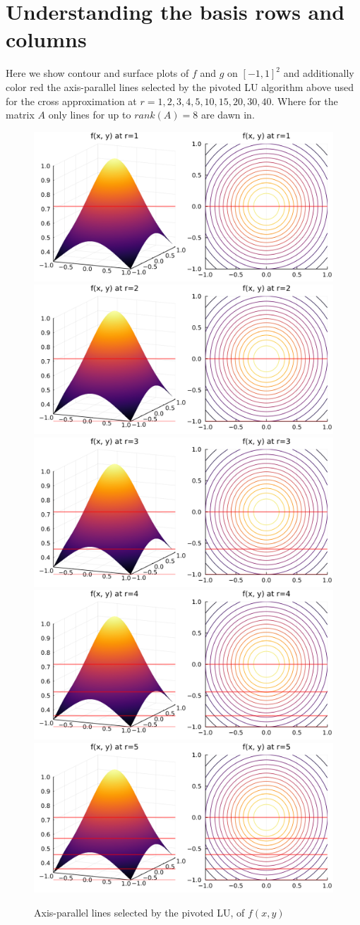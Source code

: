 \documentclass[a4paper]{article}
\begin{document}
\section{Understanding the basis rows and columns}
Here we show contour and surface plots of $f$ and $g$ on $[-1, 1]^2$ and
additionally color red the axis-parallel lines selected by the pivoted LU
algorithm above used for the cross approximation at $r = 1, 2, 3, 4, 5, 10,
15, 20, 30, 40$. Where for the matrix $A$ only lines for up to $rank(A) = 8$
are dawn in.
\begin{figure}[H]
    \centering
    \includegraphics[width=.33\textwidth]{plots/rc-a-1.png}\hfill
    \includegraphics[width=.33\textwidth]{plots/rc-a-2.png}\hfill
    \includegraphics[width=.33\textwidth]{plots/rc-a-3.png}
    \\[\smallskipamount]
    \includegraphics[width=.49\textwidth]{plots/rc-a-4.png}\hfill
    \includegraphics[width=.49\textwidth]{plots/rc-a-5.png}
    \caption{Axis-parallel lines selected by the pivoted LU, of $f(x, y)$}\label{fig:foobar}
\end{figure}
\end{document}
